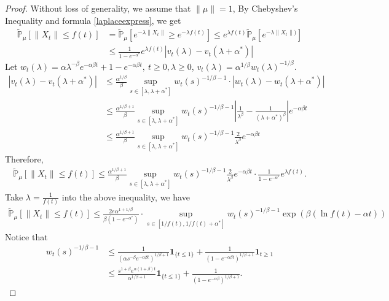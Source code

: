 \documentclass[12pt,oneside,english]{amsart}
\theoremstyle{plain}
\theoremstyle{definition}
\numberwithin{equation}{section}
\begin{document}
\begin{proof}
 Without loss of generality, we assume that $\|\mu\|=1$, By Chebyshev's Inequality and formula \eqref{laplaceexpress}, we get
\begin{align*}
    \mathbb{\tilde{P}}_{\mu}[\|X_t\|\leq f(t)]&=\mathbb{\tilde{P}}_{\mu}[e^{-\lambda\|X_t\|}\geq e^{-\lambda f(t)}]\leq e^{\lambda f(t)}\mathbb{\tilde{P}}_{\mu}[e^{-\lambda \|X_t\|)}]\\
    &\leq \frac{1}{1-e^{-\alpha^*}}e^{\lambda f(t)}\left|v_t(\lambda)-v_t(\lambda+\alpha^*)\right|
\end{align*}
Let $w_t(\lambda)=\alpha \lambda^{-\beta}e^{-\alpha \beta t}+1-e^{-\alpha\beta t},~ t\geq 0,\lambda\geq0$, $v_t(\lambda)=\alpha^{1/\beta}w_t(\lambda)^{-1/\beta}$.
\begin{align*}
    \left|v_t(\lambda)-v_t(\lambda+\alpha^*)\right|&\leq\frac {\alpha^{1/\beta}}{\beta}\sup_{s\in [\lambda,\lambda+\alpha^*]}w_t(s)^{-1/\beta-1}\cdot\left|w_t(\lambda)-w_t(\lambda+\alpha^*)\right|\\
    &\leq  \frac{\alpha^{1/\beta+1}}{\beta}\sup_{s\in [\lambda,\lambda+\alpha^*]}w_t(s)^{-1/\beta-1}\left|\frac{1}{\lambda^{\beta}}-\frac{1}{(\lambda+\alpha^*)^{\beta}}\right|e^{-\alpha\beta t}\\
    &\leq  \frac{\alpha^{1/\beta+1}}{\beta}\sup_{s\in [\lambda,\lambda+\alpha^*]}w_t(s)^{-1/\beta-1}\frac{2}{\lambda^{\beta}}e^{-\alpha\beta t}
\end{align*}
Therefore,
\begin{align*}
    \mathbb{\tilde{P}}_{\mu}[\|X_t\|\leq f(t)]\leq \frac{\alpha^{1/\beta+1}}{\beta}\sup_{s\in [\lambda,\lambda+\alpha^*]}w_t(s)^{-1/\beta-1}\frac{2}{\lambda^{\beta}}e^{-\alpha\beta t}\cdot \frac{1}{1-e^{-\alpha^*}} e^{\lambda f(t)}.
\end{align*}
Take $\lambda=\frac{1}{f(t)}$ into the above inequality, we have
\begin{align*}
    \mathbb{\tilde{P}}_{\mu}[\|X_t\|\leq f(t)]\leq \frac{2 e \alpha^{1+1/\beta}}{\beta (1-e^{-\alpha^*})}\cdot\sup_{s\in [1/f(t),1/f(t)+\alpha^*]}w_t(s)^{-1/\beta-1}\exp(\beta(\ln f(t)-\alpha t))
\end{align*}
Notice that
\begin{align*}
    w_t(s)^{-1/\beta-1}&\leq \frac{1}{(\alpha s^{-\beta}e^{-\alpha \beta t})^{1/
    \beta+1}}\mathbf{1}_{\{t\leq 1\}}+\frac{1}{(1-e^{-\alpha\beta t})^{1/\beta+1}}\mathbf{1}_{t\geq 1}\\
    &\leq \frac{s^{1+\beta}e^{\alpha(1+\beta)t}}{\alpha^{1/\beta +1}}\mathbf{1}_{\{t\leq 1\}}+\frac{1}{(1-e^{-\alpha\beta })^{1/\beta+1}}.

\end{align*}
\end{proof}
\end{document}
